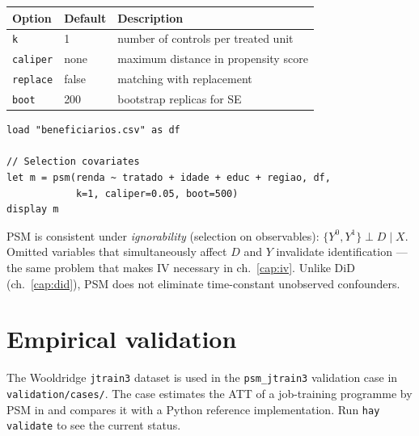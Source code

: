 \begin{center}
\begin{tabular}{lll}
\toprule
\textbf{Option} & \textbf{Default} & \textbf{Description} \\
\midrule
\texttt{k}        & 1       & number of controls per treated unit \\
\texttt{caliper}  & none    & maximum distance in propensity score \\
\texttt{replace}  & false   & matching with replacement \\
\texttt{boot}     & 200     & bootstrap replicas for SE \\
\bottomrule
\end{tabular}
\end{center}

\begin{lstlisting}[caption={Typical workflow — program evaluation}]
load "beneficiarios.csv" as df

// Selection covariates
let m = psm(renda ~ tratado + idade + educ + regiao, df,
            k=1, caliper=0.05, boot=500)
display m
\end{lstlisting}

\begin{nota}
  PSM is consistent under \emph{ignorability} (selection on observables):
  $\{Y^0, Y^1\} \perp D \mid X$. Omitted variables that simultaneously affect
  $D$ and $Y$ invalidate identification — the same problem that makes IV
  necessary in ch.~\ref{cap:iv}. Unlike DiD
  (ch.~\ref{cap:did}), PSM does not eliminate time-constant unobserved confounders.
\end{nota}

\section{Empirical validation}

The Wooldridge \texttt{jtrain3} dataset is used in the \texttt{psm\_jtrain3}
validation case in \texttt{validation/cases/}. The case estimates the ATT of
a job-training programme by PSM in \hayashi{} and compares it with a Python
reference implementation. Run \lstinline{hay validate} to see the current
status.
